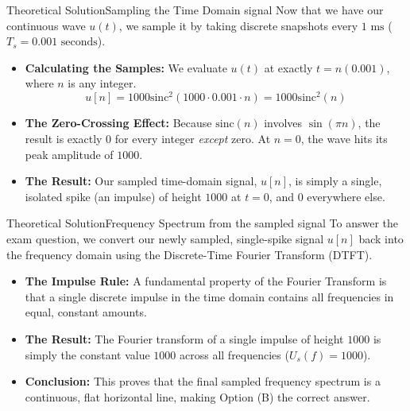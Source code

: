 \documentclass{beamer}
\begin{document}
\begin{frame}{Theoretical Solution}{Sampling the Time Domain signal}
    Now that we have our continuous wave $u(t)$, we sample it by taking discrete snapshots every $1 \text{ ms}$ ($T_s = 0.001 \text{ seconds}$). 

\begin{itemize}
    \item \textbf{Calculating the Samples:} We evaluate $u(t)$ at exactly $t = n(0.001)$, where $n$ is any integer.
    \[
    u[n] = 1000 \text{sinc}^2(1000 \cdot 0.001 \cdot n) = 1000 \text{sinc}^2(n)
    \]
    \item \textbf{The Zero-Crossing Effect:} Because $\text{sinc}(n)$ involves $\sin(\pi n)$, the result is exactly $0$ for every integer \textit{except} zero. At $n=0$, the wave hits its peak amplitude of $1000$.
    \item \textbf{The Result:} Our sampled time-domain signal, $u[n]$, is simply a single, isolated spike (an impulse) of height $1000$ at $t=0$, and $0$ everywhere else.
\end{itemize}

\end{frame}

\begin{frame}{Theoretical Solution}{Frequency Spectrum from the sampled signal}
    To answer the exam question, we convert our newly sampled, single-spike signal $u[n]$ back into the frequency domain using the Discrete-Time Fourier Transform (DTFT).

\begin{itemize}
    \item \textbf{The Impulse Rule:} A fundamental property of the Fourier Transform is that a single discrete impulse in the time domain contains all frequencies in equal, constant amounts.
    \item \textbf{The Result:} The Fourier transform of a single impulse of height $1000$ is simply the constant value $1000$ across all frequencies ($U_s(f) = 1000$). 
    \item \textbf{Conclusion:} This proves that the final sampled frequency spectrum is a continuous, flat horizontal line, making Option (B) the correct answer.
\end{itemize}
\end{frame}
\end{document}

